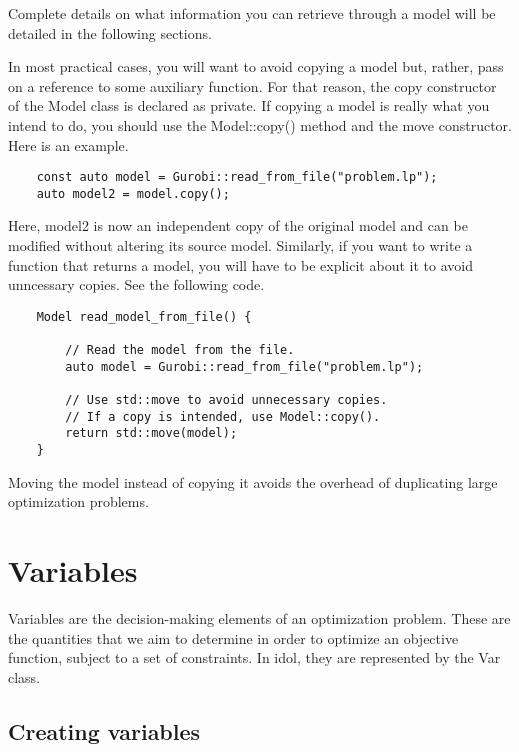 Complete details on what information you can retrieve through a model will be
detailed in the following sections. 

In most practical cases, you will want to avoid copying a model but, rather,
pass on a reference to some auxiliary function. For that reason, the copy
constructor of the \textsf{Model} class is declared as \textsf{private}. If
copying a model is really what you intend to do, you should use the
\textsf{Model::copy()} method and the move constructor. Here is an example. 

\begin{lstlisting}
    const auto model = Gurobi::read_from_file("problem.lp");
    auto model2 = model.copy();
\end{lstlisting}
Here, \textsf{model2} is now an independent copy of the original model and can
be modified without altering its source model. Similarly, if you want to write
a function that returns a model, you will have to be explicit about it to
avoid unncessary copies. See the following code.

\begin{lstlisting}
    Model read_model_from_file() {
        
        // Read the model from the file.
        auto model = Gurobi::read_from_file("problem.lp");

        // Use std::move to avoid unnecessary copies.
        // If a copy is intended, use Model::copy().
        return std::move(model); 
    }
\end{lstlisting}

Moving the model instead of copying it avoids the overhead of duplicating
large optimization problems.

\section{Variables}

Variables are the decision-making elements of an optimization problem. These
are the quantities that we aim to determine in order to optimize an objective
function, subject to a set of constraints. In \textsf{idol}, they are
represented by the \textsf{Var} class. 

\subsection{Creating variables}

